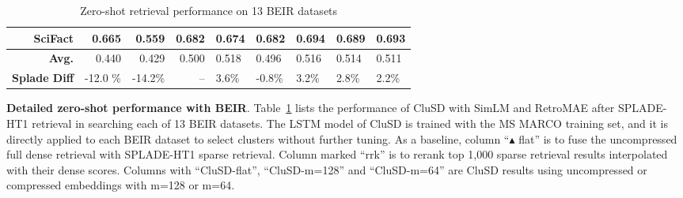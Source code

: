 {\begin{table}[h]
{\begin{tabular}{r r r r  |lllll}
                {SciFact}	& 0.665 & 0.559  & {0.682} & 0.674 &0.682&  0.694 & 0.689 & 0.693 \\
                            \hline
                \textbf{Avg.} & 0.440 & 0.429  &0.500 & 0.518 &0.496&  0.516 & 0.514 & 0.511 \\
                \textbf{{Splade Diff}} & -12.0 \% &  -14.2\%  &-- & 3.6\% & -0.8\% &3.2\% & 2.8\% & 2.2\% \\
            \hline\hline
		\end{tabular}
		}
	\caption{Zero-shot retrieval performance 
on 13 BEIR datasets 
}
  \vspace*{-5mm}
	\label{tab:beir}

\end{table}

}


\textbf{ Detailed zero-shot performance with BEIR}.
\label{sect:evalbeir}
Table~\ref{tab:beir} lists  the performance of  CluSD  
with  SimLM and  RetroMAE after SPLADE-HT1 retrieval in searching each of 13 BEIR datasets.
The LSTM model of CluSD  is trained with the  MS MARCO training set,
and it is directly applied to each BEIR  dataset to select clusters without further tuning. 
As a baseline, column ``$\blacktriangle$ flat'' is to fuse  the uncompressed full dense retrieval  with SPLADE-HT1 sparse  retrieval.
Column marked ``rrk'' is to rerank   top 1,000  sparse retrieval results interpolated with their dense scores. 
Columns with ``CluSD-flat'', ``CluSD-m=128'' and ``CluSD-m=64''  are  CluSD results  using uncompressed or compressed embeddings with
m=128 or m=64. 

